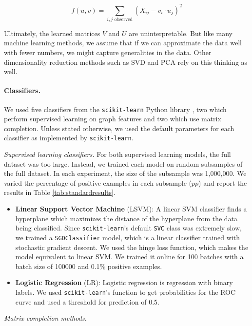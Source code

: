 \documentclass{article} %
\begin{document}
$$
f(u, v) = \sum_{i,j \text{ observed}} (X_{ij} - v_i \cdot u_j)^2
$$

Ultimately, the learned matrices $V$ and $U$ are uninterpretable. But like many machine learning methods, we assume that if we can approximate the data well with fewer numbers, we might capture generalities in the data. Other dimensionality reduction methods such as SVD and PCA rely on this thinking as well.

\paragraph{Classifiers.} We used five classifiers from the \texttt{scikit-learn} Python library \cite{scikit-learn}, two which perform supervised learning on graph features and two which use matrix completion. Unless stated otherwise, we used the default parameters for each classifier as implemented by \texttt{scikit-learn}.

\emph{Supervised learning classifiers.} For both supervised learning models, the full dataset was too large. Instead, we trained each model on random subsamples of the full dataset. In each experiment, the size of the subsample was 1,000,000. We varied the percentage of positive examples in each subsample ($pp$) and report the results in Table \ref{tab:standardresults}.

\begin{itemize}

    \item \textbf{Linear Support Vector Machine} (LSVM): A linear SVM classifier finds a hyperplane which maximizes the distance of the hyperplane from the data being classified. Since \texttt{scikit-learn}'s default \texttt{SVC} class was extremely slow, we trained a \texttt{SGDClassifier} model, which is a linear classifier trained with stochastic gradient descent. We used the hinge loss function, which makes the model equivalent to linear SVM. We trained it online for 100 batches with a batch size of 100000 and 0.1\% positive examples.

    \item \textbf{Logistic Regression} (LR): Logistic regression is regression with binary labels. We used \texttt{scikit-learn}'s  function to get probabilities for the ROC curve and used a threshold for prediction of 0.5.

\end{itemize}

\emph{Matrix completion methods.}
\end{document}
